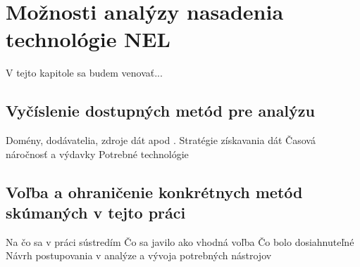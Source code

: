 \chapter{Možnosti analýzy nasadenia technológie NEL}
\label{possible-analysis-strategies}

V tejto kapitole sa budem venovať...


\section{Vyčíslenie dostupných metód pre analýzu}

Domény, dodávatelia, zdroje dát apod \cite{automatic-js-restrictor-testing}.
Stratégie získavania dát
Časová náročnosť a výdavky
Potrebné technológie


\section{Voľba a ohraničenie konkrétnych metód skúmaných v tejto práci}

Na čo sa v práci sústredím
Čo sa javilo ako vhodná voľba
Čo bolo dosiahnuteľné
Návrh postupovania v analýze a vývoja potrebných nástrojov